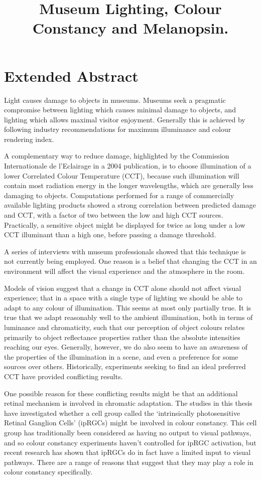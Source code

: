 \documentclass{article}
\title{Museum Lighting, Colour Constancy and Melanopsin.}
\date{}
\begin{document}
\maketitle

\section*{Extended Abstract}

Light causes damage to objects in museums. Museums seek a pragmatic compromise between lighting which causes minimal damage to objects, and lighting which allows maximal visitor enjoyment. Generally this is achieved by following industry recommendations for maximum illuminance and colour rendering index.

A complementary way to reduce damage, highlighted by the Commission Internationale de l'Eclairage in a 2004 publication, is to choose illumination of a lower Correlated Colour Temperature (CCT), because such illumination will contain most radiation energy in the longer wavelengths, which are generally less damaging to objects. Computations performed for a range of commercially available lighting products showed a strong correlation between predicted damage and CCT, with a factor of two between the low and high CCT sources. Practically, a sensitive object might be displayed for twice as long under a low CCT illuminant than a high one, before passing a damage threshold. 

A series of interviews with museum professionals showed that this technique is not currently being employed. One reason is a belief that changing the CCT in an environment will affect the visual experience and the atmosphere in the room.

Models of vision suggest that a change in CCT alone should not affect visual experience; that in a space with a single type of lighting we should be able to adapt to any colour of illumination. This seems at most only partially true. It is true that we adapt reasonably well to the ambient illumination, both in terms of luminance and chromaticity, such that our perception of object colours relates primarily to object reflectance properties rather than the absolute intensities reaching our eyes. Generally, however, we do also seem to have an awareness of the properties of the illumination in a scene, and even a preference for some sources over others. Historically, experiments seeking to find an ideal preferred CCT have provided conflicting results.

One possible reason for these conflicting results might be that an additional retinal mechanism is involved in chromatic adaptation. The studies in this thesis have investigated whether a cell group called the `intrinsically photosensitive Retinal Ganglion Cells' (ipRGCs) might be involved in colour constancy. This cell group has traditionally been considered as having no output to visual pathways, and so colour constancy experiments haven't controlled for ipRGC activation, but recent research has shown that ipRGCs do in fact have a limited input to visual pathways. There are a range of reasons that suggest that they may play a role in colour constancy specifically.
\end{document}
